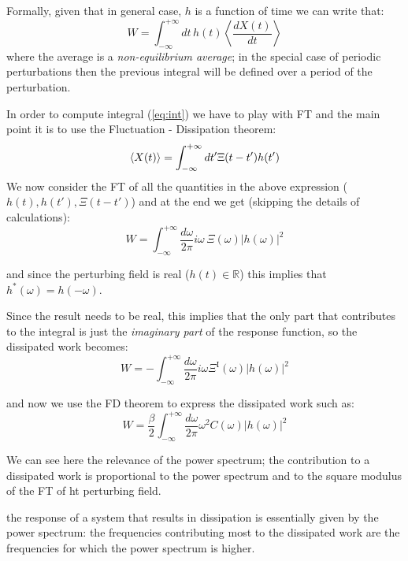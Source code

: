 \documentclass[\main/main.tex]{subfiles}
\begin{document}
Formally, given that in general case, $h$ is a function of time we can write that:
\begin{equation}
W=\int_{-\infty}^{+\infty} d t \,h(t)\left\langle\frac{d X(t)}{d t}\right\rangle
\label{eq:int}
\end{equation}
where the average is a \textit{non-equilibrium average}; in the special case of periodic perturbations then the previous integral will be defined over a period of the perturbation.

In order to compute integral (\ref{eq:int}) we have to play with FT and the main point it is to use the Fluctuation - Dissipation theorem:
\begin{equation}
    \left\langle X(t) \right\rangle=\int_{-\infty}^{+\infty} dt'\Xi(t-t')h(t')
\end{equation}
We now consider the FT of all the quantities in the above expression ($h(t),h(t'),\Xi(t-t')$) and at the end we get (skipping the details of calculations):
\begin{equation}
    W=\int_{-\infty}^{+\infty}\frac{d\omega}{2\pi}i\omega\,\Xi(\omega)|h(\omega)|^2
\end{equation}

and since the perturbing field is real ($h(t) \in \mathbb{R}$) this implies that $h^*(\omega)=h(-\omega)$.

Since the result needs to be real, this implies that the only part that contributes to the integral is just the \textit{imaginary part} of the response function, so the dissipated work becomes:
\begin{equation}
    W=-\int_{-\infty}^{+\infty}\frac{d\omega}{2\pi}i\omega\Xi^{\text{I}}(\omega)|h(\omega)|^2
\end{equation}

and now we use the FD theorem to express the dissipated work such as:
\begin{equation}
    W=\frac{\beta}{2} \int_{-\infty}^{+\infty} \frac{d \omega}{2 \pi} \omega^{2} C(\omega)|h(\omega)|^{2}
\end{equation}

We can see here the relevance of the power spectrum; the contribution to a dissipated work is proportional to the power spectrum and to the square modulus of the FT of ht perturbing field.

the response of a system that results in dissipation is essentially given by the power spectrum: the frequencies contributing most to the dissipated work are the frequencies for which the power spectrum is higher. \\
\end{document}
